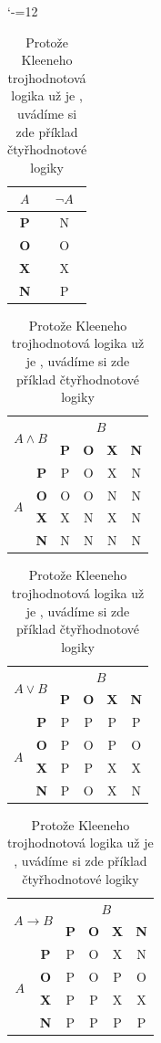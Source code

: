 \documentclass[a4paper, 11pt]{article}
\begin{document}
\begin{table}[h]
    \centering
    \catcode`-=12
    \begin{tabular}{|c|c|}
    \hline
	$A$	       & ${\neg}A$\\ \hline
	\textbf{P} & N\\ \hline
	\textbf{O} & O\\ \hline
	\textbf{X} & X\\ \hline
	\textbf{N} & P\\ \hline
    \end{tabular}
    \begin{tabular}{|c|c|c|c|c|c|}
    \hline
    \multicolumn{2}{|c}{\multirow{2}{*}{$A \wedge B$}} & \multicolumn{4}{|c|}{$B$}\\ \cline{3-6}
    \multicolumn{2}{|c|}{} & \textbf{P} & \textbf{O} & \textbf{X} & \textbf{N}\\ \hline
    \multirow{4}{*}{$A$} & \textbf{P} & P & O & X & N\\ \cline{2-6}
                         & \textbf{O} & O & O & N & N\\ \cline{2-6}
                         & \textbf{X} & X & N & X & N\\ \cline{2-6}
                         & \textbf{N} & N & N & N & N\\ \cline{2-6} \hline 
    \end{tabular}
    \begin{tabular}{|c|c|c|c|c|c|}
    \hline
    \multicolumn{2}{|c}{\multirow{2}{*}{$A \vee B$}} & \multicolumn{4}{|c|}{$B$}\\ \cline{3-6}
    \multicolumn{2}{|c|}{} & \textbf{P} & \textbf{O} & \textbf{X} & \textbf{N}\\ \hline
    \multirow{4}{*}{$A$} & \textbf{P} & P & P & P & P\\ \cline{2-6}
                         & \textbf{O} & P & O & P & O\\ \cline{2-6}
                         & \textbf{X} & P & P & X & X\\ \cline{2-6}
                         & \textbf{N} & P & O & X & N\\ \cline{2-6} \hline 
    \end{tabular}
    \begin{tabular}{|c|c|c|c|c|c|}
    \hline
    \multicolumn{2}{|c}{\multirow{2}{*}{$A \rightarrow B$}} & \multicolumn{4}{|c|}{$B$}\\ \cline{3-6}
    \multicolumn{2}{|c|}{} & \textbf{P} & \textbf{O} & \textbf{X} & \textbf{N}\\ \hline
    \multirow{4}{*}{$A$} & \textbf{P} & P & O & X & N\\ \cline{2-6}
                         & \textbf{O} & P & O & P & O\\ \cline{2-6}
                         & \textbf{X} & P & P & X & X\\ \cline{2-6}
                         & \textbf{N} & P & P & P & P\\ \cline{2-6} \hline 
    \end{tabular}
    \caption{Protože Kleeneho trojhodnotová logika už je , uvádíme si zde příklad čtyřhodnotové logiky}
    \label{tabulka_logika}
\end{table}
\end{document}
